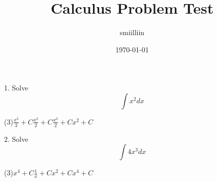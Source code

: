 \documentclass{article}
\title{Calculus Problem Test}
\author{smiilliin}
\date{\today}
\begin{document}
\maketitle\begin{multicols*}{2}
\noindent
\begin{minipage}{\linewidth}
1. Solve \[ \int x^2 dx \]\begin{tasks}[label=\textcircled{\scriptsize\arabic*},label-width=13pt](3)\task \( \frac{x^3}{3} + C \)\task \( \frac{x^2}{2} + C \)\task \( \frac{x^3}{2} + C \)\task \( x^2 + C \)\end{tasks}
\end{minipage}
\bigskip

\noindent
\begin{minipage}{\linewidth}
2. Solve \[ \int 4x^3 dx \]\begin{tasks}[label=\textcircled{\scriptsize\arabic*},label-width=13pt](3)\task \( {x^4} + C \)\task \( \frac{1}{x} + C \)\task \( {x^2} + C \)\task \( x^4 + C \)\end{tasks}
\end{minipage}
\bigskip

\end{multicols*}
\end{document}
